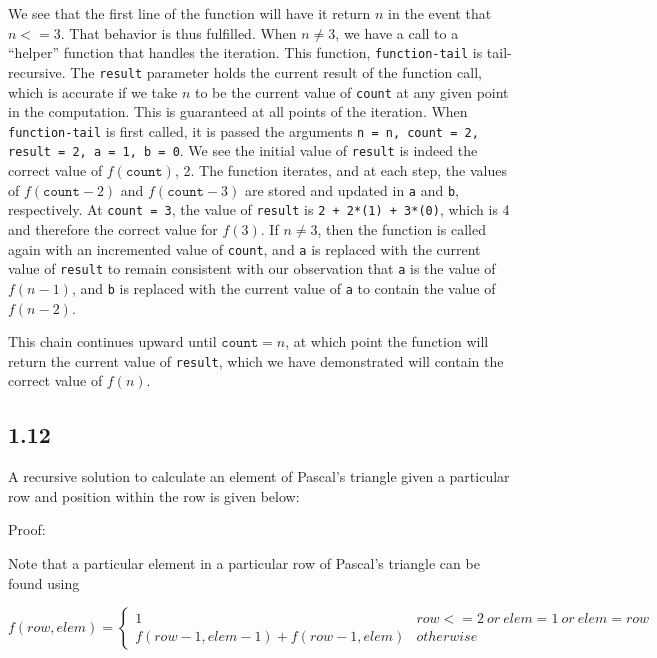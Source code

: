 \documentclass{article}
\begin{document}
We see that the first line of the function will have it return $n$ in the event that $n <= 3$. That behavior is thus fulfilled. When $n \neq 3$, we have a call to a ``helper'' function that handles the iteration. This function, \texttt{function-tail} is tail-recursive. The \texttt{result} parameter holds the current result of the function call, which is accurate if we take $n$ to be the current value of \texttt{count} at any given point in the computation. This is guaranteed at all points of the iteration. When \texttt{function-tail} is first called, it is passed the arguments \texttt{n = n, count = 2, result = 2, a = 1, b = 0}. We see the initial value of \texttt{result} is indeed the correct value of $f(\texttt{count})$, 2. The function iterates, and at each step, the values of $f(\texttt{count}-2)$ and $f(\texttt{count}-3)$ are stored and updated in \texttt{a} and \texttt{b}, respectively. 
At \texttt{count = 3}, the value of \texttt{result} is \texttt{2 + 2*(1) + 3*(0)}, which is 4 and therefore the correct value for $f(3)$. If $n \neq 3$, then the function is called again with an incremented value of \texttt{count}, and \texttt{a} is replaced with the current value of \texttt{result} to remain consistent with our observation that \texttt{a} is the value of $f(n-1)$, and \texttt{b} is replaced with the current value of \texttt{a} to contain the value of $f(n-2)$.

This chain continues upward until $\texttt{count} = n$, at which point the function will return the current value of \texttt{result}, which we have demonstrated will contain the correct value of $f(n)$.

\subsection*{1.12}

A recursive solution to calculate an element of Pascal's triangle given a particular row and position within the row is given below:



Proof:

Note that a particular element in a particular row of Pascal's triangle can be found using 

$f(row, elem) = \begin{cases}1 & row <= 2\ or\ elem = 1\ or\ elem = row \\
                            f(row-1, elem-1) + f(row-1, elem) & otherwise
                \end{cases}$
\end{document}
